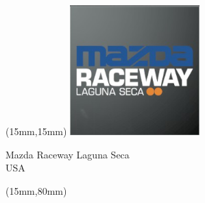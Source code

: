 \begin{textblock*}{50mm}(15mm,15mm)%
\includegraphics[width=50mm]{LG/2015-05-20_00085.png}
\par Mazda Raceway Laguna Seca\\ USA
\end{textblock*}
\begin{textblock*}{185mm}(15mm,80mm)%
\end{textblock*}
